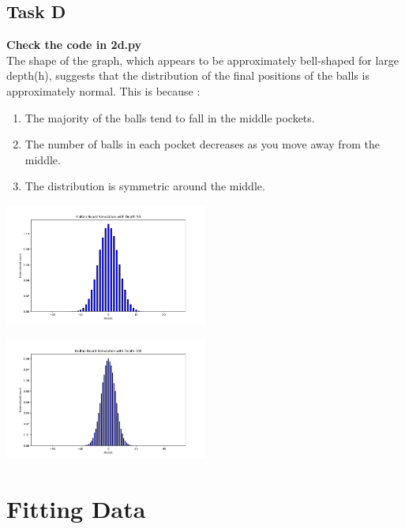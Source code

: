 \documentclass[12pt]{article}
\begin{document}
\subsection{Task D}
\textbf{Check the code in 2d.py} \\
The shape of the graph, which appears to be approximately bell-shaped for large depth(h), suggests that the distribution of the final positions of the balls is approximately normal.
\newline
This is because :
\begin{enumerate}
    \item The majority of the balls tend to fall in the middle pockets.
    \item The number of balls in each pocket decreases as you move away from the middle.
    \item The distribution is symmetric around the middle.
\end{enumerate}
\begin{minipage}{\linewidth}
    \begin{center}
        \includegraphics[width=0.5\textwidth]{images/2d2.png}
    \end{center}
\end{minipage}
\begin{minipage}{\linewidth}
    \begin{center}
        \includegraphics[width=0.5\textwidth]{images/2d3.png}
    \end{center}
\end{minipage}
\section{Fitting Data}
\end{document}
